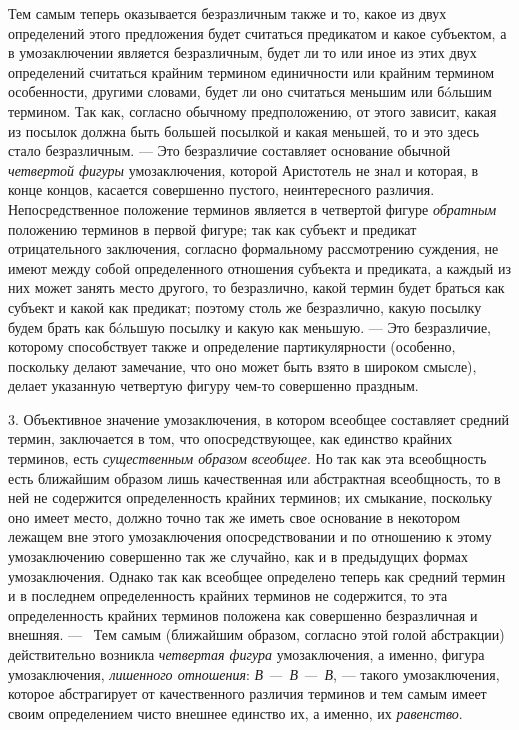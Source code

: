 \documentclass[twoside]{article}
\begin{document}
{{{{{Тем самым теперь оказывается безразличным также и то, какое из
двух определений этого предложения будет считаться предикатом и какое
субъектом, а в умозаключении является безразличным, будет ли то или иное из
этих двух определений считаться крайним термином единичности или крайним
термином особенности, другими словами, будет ли оно считаться меньшим или
бóльшим термином. Так как, согласно обычному предположению, от этого
зависит, какая из посылок должна быть большей посылкой и какая меньшей, то
и это здесь стало безразличным. — Это безразличие составляет
основание обычной {\em четвертой фигуры} умозаключения, 
которой Аристотель не знал и которая,
в конце концов, касается совершенно пустого, неинтересного различия.
Непосредственное положение терминов является в четвертой фигуре
{\em обратным} положению
терминов в первой фигуре; так как субъект и предикат отрицательного
заключения, согласно формальному рассмотрению суждения, не имеют между
собой определенного отношения субъекта и предиката, а каждый из них может
занять место другого, то безразлично, какой термин будет браться как
субъект и какой как предикат; поэтому столь же безразлично, какую посылку
будем брать как бóльшую посылку и какую как меньшую. —
Это безразличие, которому способствует также и определение
партикулярности (особенно, поскольку делают замечание, что оно может быть
взято в широком смысле), делает указанную четвертую фигуру чем-то
совершенно праздным.

3. Объективное значение умозаключения, в котором всеобщее
составляет средний термин, заключается в том, что опосредствующее, как
единство крайних терминов, есть
{\em существенным образом всеобщее}.
Но так как эта всеобщность есть ближайшим образом лишь
качественная или абстрактная всеобщность, то в ней не содержится
определенность крайних терминов; их смыкание, поскольку оно имеет место,
должно точно так же иметь свое основание в некотором лежащем вне этого
умозаключения опосредствовании и по отношению к этому умозаключению
совершенно так же случайно, как и в предыдущих формах умозаключения. Однако
так как всеобщее определено теперь как средний термин и в последнем
определенность крайних терминов не содержится, то эта определенность
крайних терминов положена как совершенно безразличная и внешняя. —
\ Тем самым (ближайшим образом, согласно этой голой
абстракции) действительно возникла
{\em четвертая фигура}
умозаключения, а именно, фигура умозаключения,
{\em лишенного отношения}:
{\em В —~В
—~В}, — такого умозаключения, которое
абстрагирует от качественного различия терминов и тем самым имеет своим
определением чисто внешнее единство их, а именно, их
{\em равенство}.

}}}}}
\end{document}
